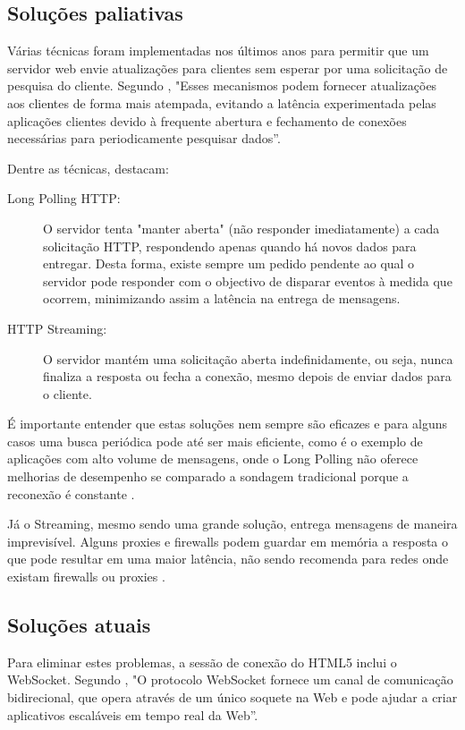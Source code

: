 \subsection{Soluções paliativas}

Várias técnicas foram implementadas nos últimos anos para permitir que um servidor web envie atualizações para clientes sem esperar por uma solicitação de pesquisa do cliente. Segundo \citet[p.~3]{Loreto2011}, "Esses mecanismos podem fornecer atualizações aos clientes de forma mais atempada, evitando a latência experimentada pelas aplicações clientes devido à frequente abertura e fechamento de conexões necessárias para periodicamente pesquisar dados”.

Dentre as técnicas, \citet{Loreto2011} destacam:
\begin{description}
	\item[Long Polling HTTP:] O servidor tenta "manter aberta" (não responder imediatamente) a cada solicitação HTTP, respondendo apenas quando há novos dados para entregar. Desta forma, existe sempre um pedido pendente ao qual o servidor pode responder com o objectivo de disparar eventos à medida que ocorrem, minimizando assim a latência na entrega de mensagens.

	\item[HTTP Streaming:] O servidor mantém uma solicitação aberta indefinidamente, ou seja, nunca finaliza a resposta ou fecha a conexão, mesmo depois de enviar dados para o cliente.
\end{description}

É importante entender que estas soluções nem sempre são eficazes e para alguns casos uma busca periódica pode até ser mais eficiente, como é o exemplo de aplicações com alto volume de mensagens, onde o Long Polling não oferece melhorias de desempenho se comparado a sondagem tradicional porque a reconexão é constante \citep{Wang2013}.

Já o Streaming, mesmo sendo uma grande solução, entrega mensagens de maneira imprevisível. Alguns proxies e firewalls podem guardar em memória a resposta o que pode resultar em uma maior latência, não sendo recomenda para redes onde existam firewalls ou proxies \citep[p.~6]{Wang2013}.

\subsection{Soluções atuais}

Para eliminar estes problemas, a sessão de conexão do HTML5 inclui o WebSocket. Segundo \citet[p.~47, Tradução~nossa]{Pimentel2012}, "O protocolo WebSocket fornece um canal de comunicação bidirecional, que opera através de um único soquete na Web e pode ajudar a criar aplicativos escaláveis em tempo real da Web”.

